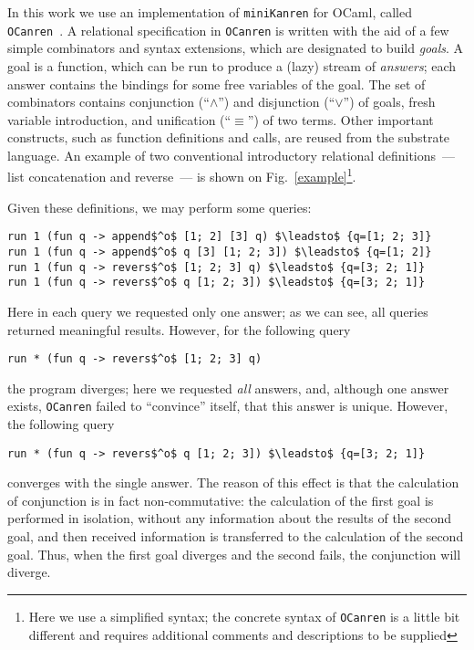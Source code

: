 \documentclass[preprint,numbers,10pt]{sigplanconf}
\newcommand{\miniKanren}{\texttt{miniKanren}\xspace}
\newcommand{\ocanren}{\texttt{OCanren}\xspace}
\begin{document}
In this work we use an implementation of \miniKanren for OCaml, called \ocanren~\cite{Ocanren}. A relational specification in \ocanren is written with the aid of
a few simple combinators and syntax extensions, which are designated to build \emph{goals}. A goal is a function, which can be run to produce a (lazy) stream of
\emph{answers}; each answer contains the bindings for some free variables of the goal. The set of combinators contains conjunction (``$\wedge$'') and disjunction
(``$\vee$'') of goals, fresh variable introduction, and unification (``$\equiv$'') of two terms. Other important constructs, such as function definitions and calls, are 
reused from the substrate language. An example of two conventional introductory relational definitions~--- list concatenation and reverse~--- is shown on 
Fig.~\ref{example}\footnote{Here we use a simplified syntax; the concrete syntax of \ocanren is a little bit different and requires additional comments and 
descriptions to be supplied}.

Given these definitions, we may perform some queries:

\begin{lstlisting}
run 1 (fun q -> append$^o$ [1; 2] [3] q) $\leadsto$ {q=[1; 2; 3]}
run 1 (fun q -> append$^o$ q [3] [1; 2; 3]) $\leadsto$ {q=[1; 2]}
run 1 (fun q -> revers$^o$ [1; 2; 3] q) $\leadsto$ {q=[3; 2; 1]}
run 1 (fun q -> revers$^o$ q [1; 2; 3]) $\leadsto$ {q=[3; 2; 1]}
\end{lstlisting}

Here in each query we requested only one answer; as we can see, all queries returned meaningful results. However, for the following query

\begin{lstlisting}
run * (fun q -> revers$^o$ [1; 2; 3] q)
\end{lstlisting}

\noindent the program diverges; here we requested \emph{all} answers, and, although one answer exists, \ocanren failed to ``convince'' itself, 
that this answer is unique. However, the following query

\begin{lstlisting}
run * (fun q -> revers$^o$ q [1; 2; 3]) $\leadsto$ {q=[3; 2; 1]}
\end{lstlisting}

\noindent converges with the single answer. The reason of this effect is that the calculation of conjunction is in fact non-commutative: the calculation 
of the first goal is performed in isolation, without any information about the results of the second goal, and then received information is transferred to the 
calculation of the second goal. Thus, when the first goal diverges and the second fails, the conjunction will diverge.
\end{document}
